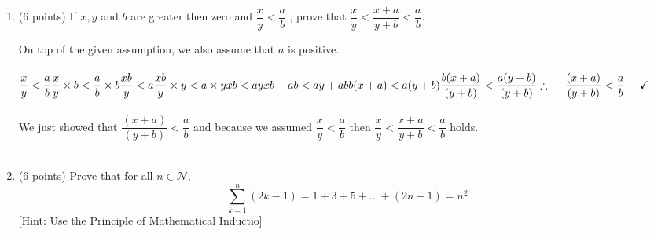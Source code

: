 \documentclass[fleqn]{article}
\begin{document}
  \begin{enumerate}
    \item (6 points)  If $x, y$ and $b$ are greater then zero and $\dfrac{x}{y}<\dfrac{a}{b}$
    , prove that $\dfrac{x}{y} < \dfrac{x+a}{y+b} < \dfrac{a}{b}$.

      \textcolor{hwColor}{
        On top of the given assumption, we also assume that $a$ is positive.
        \\
        \\
        $
          \dfrac{x}{y} < \dfrac{a}{b}
          \\
          \\
          \dfrac{x}{y} \times b < \dfrac{a}{b} \times b
          \\
          \\
          \dfrac{xb}{y} < a
          \\
          \\
          \dfrac{xb}{y} \times y < a \times y
          \\
          \\
          xb < ay 
          \\
          \\
          xb+ab < ay+ab
          \\
          \\
          b(x+a) < a(y+b)
          \\
          \\
          \dfrac{b(x+a)}{(y+b)} < \dfrac{a(y+b)}{(y+b)}
          \\
          \\
          \\
          \therefore ~~~~ \dfrac{(x+a)}{(y+b)} < \dfrac{a}{b} ~~~~ \checkmark
        $
        \\
        \\
        We just showed that $\dfrac{(x+a)}{(y+b)} < \dfrac{a}{b}$ and because we assumed $\dfrac{x}{y}<\dfrac{a}{b}$ then 
        $\dfrac{x}{y} < \dfrac{x+a}{y+b} < \dfrac{a}{b}$ holds.
        \\
        \\
      }

    \item (6 points) Prove that for all $n \in \mathcal{N}$,
    $$
      \sum\limits_{k=1}^{n} (2k-1)=1+3+5+...+(2n-1)=n^2
    $$
    [Hint: Use the Principle of Mathematical Inductio]





\end{enumerate}
\end{document}
